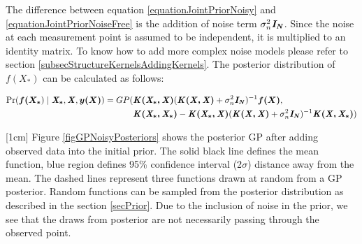 The difference between equation \ref{equationJointPriorNoisy} and \ref{equationJointPriorNoiseFree} is the addition of noise term $\sigma^{2}_{n}\bm{\mathit{I_N}}$. Since the noise at each measurement point is assumed to be independent, it is multiplied to an identity matrix. To know how to add more complex noise models please refer to section \ref{subsecStructureKernelsAddingKernels}. The posterior distribution of $f(X_{*})$ can be calculated as follows:

  \begin{equation}\label{eqNoisyPredictiveGP}
  \begin{aligned}
  \Pr(\boldsymbol{f(X_{*}}) \mid \bm{\mathit{X_{*}}}, \bm{\mathit{X}}, \boldsymbol{y(X)}) = GP(  & \bm{\mathit{K(X_{*}, X)}}( \bm{\mathit{K(X, X)}} + \sigma^{2}_{n}\bm{\mathit{I_N}} )^{-1}\boldsymbol{f(X)},   \\ 
                                & \bm{\mathit{K(X_{*}, X_{*})}} - \bm{\mathit{K(X_{*}, X)}}( \bm{\mathit{K(X, X)}} + \sigma^{2}_{n}\bm{\mathit{I_N}} )^{-1} \bm{\mathit{K(X, X_{*})}})
  \end{aligned}
  \end{equation}


[1cm]
Figure \ref{figGPNoisyPosteriors} shows the posterior GP after adding observed data into the initial prior. The solid black line defines the mean function, blue region defines 95\% confidence interval (2$\sigma$) distance away from the mean. The dashed lines represent three functions drawn at random from a GP posterior. Random functions can be sampled from the posterior distribution as described in the section \ref{secPrior}.  Due to the inclusion of noise in the prior, we see that the draws from posterior are not necessarily passing through the observed point.

